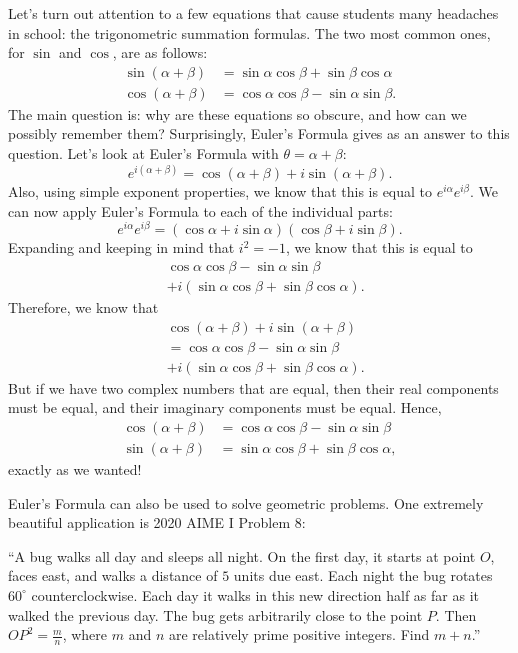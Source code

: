 \documentclass{article}
\begin{document}
\begin{multicols}{3}
Let's turn out attention to a few equations that cause students many headaches in school: the trigonometric summation formulas. The two most common ones, for $\sin$ and $\cos$, are as follows:
\begin{align*}
    \sin(\alpha+\beta)&=\sin\alpha\cos\beta+\sin\beta\cos\alpha \\
    \cos(\alpha+\beta)&=\cos\alpha\cos\beta-\sin\alpha\sin\beta.
\end{align*}
The main question is: why are these equations so obscure, and how can we possibly remember them? Surprisingly, Euler's Formula gives as an answer to this question. Let's look at Euler's Formula with $\theta=\alpha+\beta$:
\[e^{i(\alpha+\beta)}=\cos(\alpha+\beta)+i\sin(\alpha+\beta).\]
Also, using simple exponent properties, we know that this is equal to $e^{i\alpha}e^{i\beta}$. We can now apply Euler's Formula to each of the individual parts:
\[e^{i\alpha}e^{i\beta}=(\cos\alpha+i\sin\alpha)(\cos\beta+i\sin\beta).\]
Expanding and keeping in mind that $i^2=-1$, we know that this is equal to
\begin{align*}
&\cos\alpha\cos\beta-\sin\alpha\sin\beta \\&+i(\sin\alpha\cos\beta+\sin\beta\cos\alpha).
\end{align*}
Therefore, we know that
\begin{align*}
&\cos(\alpha+\beta)+i\sin(\alpha+\beta) \\
&=\cos\alpha\cos\beta-\sin\alpha\sin\beta \\
&+i(\sin\alpha\cos\beta+\sin\beta\cos\alpha).
\end{align*}
But if we have two complex numbers that are equal, then their real components must be equal, and their imaginary components must be equal. Hence,
\begin{align*}
    \cos(\alpha+\beta)&=\cos\alpha\cos\beta-\sin\alpha\sin\beta \\
    \sin(\alpha+\beta)&=\sin\alpha\cos\beta+\sin\beta\cos\alpha,
\end{align*}
exactly as we wanted!

Euler's Formula can also be used to solve geometric problems. One extremely beautiful application is 2020 AIME I Problem 8:

``A bug walks all day and sleeps all night. On the first day, it starts at point $O$, faces east, and walks a distance of $5$ units due east. Each night the bug rotates $60^\circ$ counterclockwise. Each day it walks in this new direction half as far as it walked the previous day. The bug gets arbitrarily close to the point $P$. Then $OP^2=\tfrac{m}{n}$, where $m$ and $n$ are relatively prime positive integers. Find $m+n$.''


\end{multicols}
\end{document}
